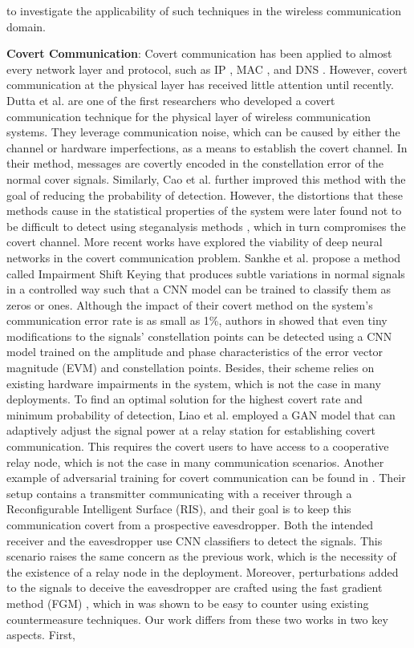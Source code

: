 to investigate the applicability of such techniques in the wireless communication domain.


\textbf{Covert Communication}: Covert communication has been applied to almost every network layer and protocol, such as IP \cite{cabuk2004ip}, MAC \cite{sheikholeslami2020covert}, and DNS \cite{nussbaum2009robust}. However, covert communication at the physical layer has received little attention until recently. Dutta et al. \cite{dutta2012secret} are one of the first researchers who developed a covert communication technique for the physical layer of wireless communication systems. They leverage communication noise, which can be caused by either the channel or hardware imperfections, as a means to establish the covert channel. In their method, messages are covertly encoded in the constellation error of the normal cover signals. Similarly, Cao et al. \cite{cao2018wireless} further improved this method with the goal of reducing the probability of detection. However, the distortions that these methods cause in the statistical properties of the system were later found not to be difficult to detect using steganalysis methods \cite{huang2020exploiting}, which in turn compromises the covert channel. More recent works have explored the viability of deep neural networks in the covert communication problem. Sankhe et al. \cite{sankhe2019impairment} propose a method called Impairment Shift Keying that produces subtle variations in normal signals in a controlled way such that a CNN model can be trained to classify them as zeros or ones. Although the impact of their covert method on the system's communication error rate is as small as 1\%, authors in \cite{huang2021detection} showed that even tiny modifications to the signals' constellation points can be detected using a CNN model trained on the amplitude and phase characteristics of the error vector magnitude (EVM) and constellation points. Besides, their scheme relies on existing hardware impairments in the system, which is not the case in many deployments. To find an optimal solution for the highest covert rate and minimum probability of detection, Liao et al. \cite{liao2020generative} employed a GAN model that can adaptively adjust the signal power at a relay station for establishing covert communication. This requires the covert users to have access to a cooperative relay node, which is not the case in many communication scenarios. Another example of adversarial training for covert communication can be found in \cite{kim2022covert}. Their setup contains a transmitter communicating with a receiver through a Reconfigurable Intelligent Surface (RIS), and their goal is to keep this communication covert from a prospective eavesdropper. Both the intended receiver and the eavesdropper use CNN classifiers to detect the signals. This scenario raises the same concern as the previous work, which is the necessity of the existence of a relay node in the deployment. Moreover, perturbations added to the signals to deceive the eavesdropper are crafted using the fast gradient method (FGM) \cite{goodfellow2014explaining}, which in \cite{bahramali2021robust} was shown to be easy to counter using existing countermeasure techniques. Our work differs from these two works in two key aspects. First, 